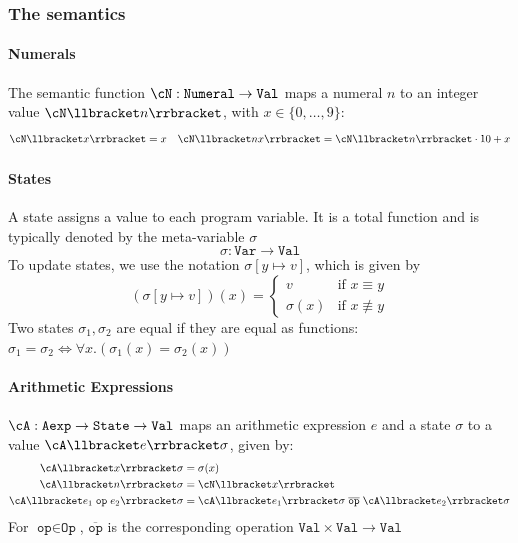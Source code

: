 \subsubsection{The semantics}
\paragraph{Numerals}
The semantic function $\cN : \texttt{Numeral} \rightarrow \texttt{Val}$ maps a numeral $n$ to an integer value $\cN\llbracket n \rrbracket$,
with $x \in \{ 0, \ldots, 9 \}$:
\begin{align*}
    \cN\llbracket x \rrbracket = x &  & \cN\llbracket n x \rrbracket = \cN\llbracket n \rrbracket \cdot 10 + x
\end{align*}


\paragraph{States}
A state assigns a value to each program variable. It is a total function and is typically denoted by the meta-variable $\sigma$
\[
    \sigma : \texttt{Var} \rightarrow \texttt{Val}
\]
To update states, we use the notation $\sigma[y \mapsto v]$, which is given by
\[
    (\sigma[y \mapsto v])(x) = \begin{cases}
        v         & \text{if } x \equiv y     \\
        \sigma(x) & \text{if } x \not\equiv y
    \end{cases}
\]
Two states $\sigma_1, \sigma_2 $ are equal if they are equal as functions: $\sigma_1 = \sigma_2 \Leftrightarrow \forall x. (\sigma_1(x) = \sigma_2(x))$


\paragraph{Arithmetic Expressions}
$\cA : \texttt{Aexp} \rightarrow \texttt{State} \rightarrow \texttt{Val}$ maps an arithmetic expression $e$ and a state $\sigma$ to a value $\cA\llbracket e \rrbracket \sigma$,
given by:
\begin{align*}
    \cA\llbracket x \rrbracket \sigma                         & = \sigma(x)                                                                                            \\
    \cA\llbracket n \rrbracket \sigma                         & = \cN\llbracket x \rrbracket                                                                           \\
    \cA\llbracket e_1 \; \texttt{op} \; e_2 \rrbracket \sigma & = \cA\llbracket e_1 \rrbracket \sigma \; \overline{\texttt{op}} \; \cA\llbracket e_2 \rrbracket \sigma
\end{align*}
For $\texttt{op} \in \texttt{Op}$, $\overline{\texttt{op}}$ is the corresponding operation $\texttt{Val} \times \texttt{Val} \rightarrow \texttt{Val}$


